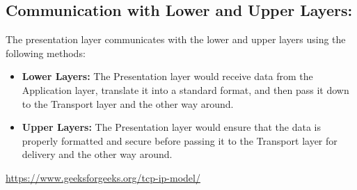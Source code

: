 \documentclass[a4paper]{exam}
\begin{document}
\begin{questions}
\begin{solution}
                \subsection*{Communication with Lower and Upper Layers:}
                The presentation layer communicates with the lower and upper layers using the following methods:
                \begin{itemize}
                    \item \textbf{Lower Layers:} The Presentation layer would receive data from the Application layer, translate it into a standard format, and then pass it down to the Transport layer and the other way around.
                    \item \textbf{Upper Layers:} The Presentation layer would ensure that the data is properly formatted and secure before passing it to the Transport layer for delivery and the other way around.
                \end{itemize}
                \begin{center}
                    \begin{minipage}{\textwidth}
                        \centering
                    \end{minipage}
                \end{center}
            \begin{thebibliography}{9}
                \url{https://www.geeksforgeeks.org/tcp-ip-model/}
                

\end{thebibliography}
\end{solution}
\end{questions}
\end{document}
